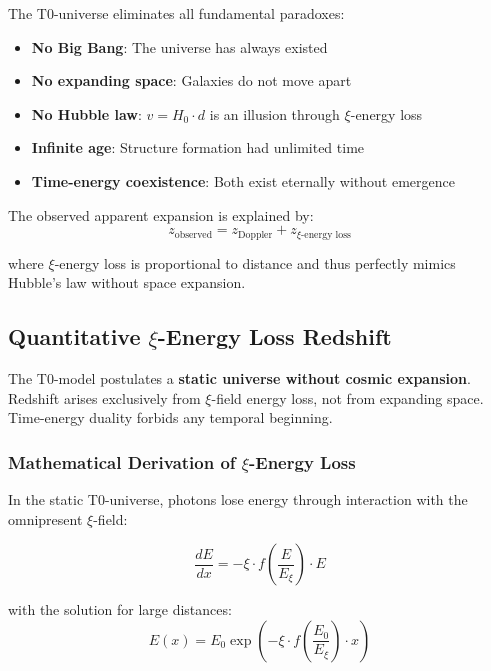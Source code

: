 \documentclass[12pt,a4paper]{article}
\theoremstyle{definition}
\begin{document}
	The T0-universe eliminates all fundamental paradoxes:
	\begin{itemize}
		\item \textbf{No Big Bang}: The universe has always existed
		\item \textbf{No expanding space}: Galaxies do not move apart
		\item \textbf{No Hubble law}: $v = H_0 \cdot d$ is an illusion through $\xi$-energy loss
		\item \textbf{Infinite age}: Structure formation had unlimited time
		\item \textbf{Time-energy coexistence}: Both exist eternally without emergence
	\end{itemize}
	
	The observed apparent expansion is explained by:
	\begin{equation}
		z_{\text{observed}} = z_{\text{Doppler}} + z_{\xi\text{-energy loss}}
	\end{equation}
	
	where $\xi$-energy loss is proportional to distance and thus perfectly mimics Hubble's law without space expansion.
	
	\subsection{Quantitative $\xi$-Energy Loss Redshift}
	
	\begin{important}
		The T0-model postulates a \textbf{static universe without cosmic expansion}. Redshift arises exclusively from $\xi$-field energy loss, not from expanding space. Time-energy duality forbids any temporal beginning.
	\end{important}
	
	\subsubsection{Mathematical Derivation of $\xi$-Energy Loss}
	
	In the static T0-universe, photons lose energy through interaction with the omnipresent $\xi$-field:
	
	\begin{equation}
		\frac{dE}{dx} = -\xi \cdot f\left(\frac{E}{E_\xi}\right) \cdot E
	\end{equation}
	
	with the solution for large distances:
	\begin{equation}
		E(x) = E_0 \exp\left(-\xi \cdot f\left(\frac{E_0}{E_\xi}\right) \cdot x\right)
	\end{equation}
	
\end{document}
